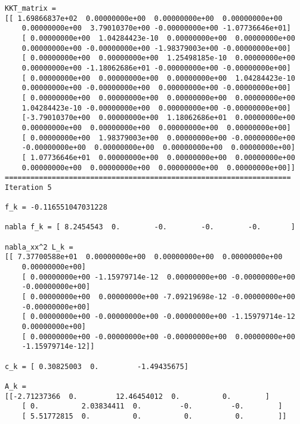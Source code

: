 \documentclass{article}
\begin{document}
\begin{verbatim}
KKT_matrix = 
[[ 1.69866837e+02  0.00000000e+00  0.00000000e+00  0.00000000e+00
    0.00000000e+00  3.79010370e+00 -0.00000000e+00 -1.07736646e+01]
    [ 0.00000000e+00  1.04284423e-10  0.00000000e+00  0.00000000e+00
    0.00000000e+00 -0.00000000e+00 -1.98379003e+00 -0.00000000e+00]
    [ 0.00000000e+00  0.00000000e+00  1.25498185e-10  0.00000000e+00
    0.00000000e+00 -1.18062686e+01 -0.00000000e+00 -0.00000000e+00]
    [ 0.00000000e+00  0.00000000e+00  0.00000000e+00  1.04284423e-10
    0.00000000e+00 -0.00000000e+00  0.00000000e+00 -0.00000000e+00]
    [ 0.00000000e+00  0.00000000e+00  0.00000000e+00  0.00000000e+00
    1.04284423e-10 -0.00000000e+00  0.00000000e+00 -0.00000000e+00]
    [-3.79010370e+00  0.00000000e+00  1.18062686e+01  0.00000000e+00
    0.00000000e+00  0.00000000e+00  0.00000000e+00  0.00000000e+00]
    [ 0.00000000e+00  1.98379003e+00  0.00000000e+00 -0.00000000e+00
    -0.00000000e+00  0.00000000e+00  0.00000000e+00  0.00000000e+00]
    [ 1.07736646e+01  0.00000000e+00  0.00000000e+00  0.00000000e+00
    0.00000000e+00  0.00000000e+00  0.00000000e+00  0.00000000e+00]]
===================================================================
Iteration 5

f_k = -0.116551047031228

nabla f_k = [ 8.2454543  0.        -0.        -0.        -0.       ]

nabla_xx^2 L_k = 
[[ 7.37700588e+01  0.00000000e+00  0.00000000e+00  0.00000000e+00
    0.00000000e+00]
    [ 0.00000000e+00 -1.15979714e-12  0.00000000e+00 -0.00000000e+00
    -0.00000000e+00]
    [ 0.00000000e+00  0.00000000e+00 -7.09219698e-12 -0.00000000e+00
    -0.00000000e+00]
    [ 0.00000000e+00 -0.00000000e+00 -0.00000000e+00 -1.15979714e-12
    0.00000000e+00]
    [ 0.00000000e+00 -0.00000000e+00 -0.00000000e+00  0.00000000e+00
    -1.15979714e-12]]

c_k = [ 0.30825003  0.         -1.49435675]

A_k = 
[[-2.71237366  0.         12.46454012  0.          0.        ]
    [ 0.          2.03834411  0.         -0.         -0.        ]
    [ 5.51772815  0.          0.          0.          0.        ]]


\end{verbatim}
\end{document}
